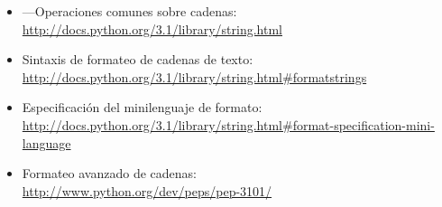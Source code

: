 \begin{itemize}

\item {}---Operaciones comunes sobre cadenas:\\
\href{http://docs.python.org/3.1/library/string.html}{http://docs.python.org/3.1/library/string.html}

\item Sintaxis de formateo de cadenas de texto:\\
\href{http://docs.python.org/3.1/library/string.html\#formatstrings}{http://docs.python.org/3.1/library/string.html\#formatstrings}

\item Especificación del minilenguaje de formato:\\
\href{http://docs.python.org/3.1/library/string.html\#format-specification-mini-language}{http://docs.python.org/3.1/library/string.html\#format-specification-mini-language}

\item {} Formateo avanzado de cadenas:\\
\href{http://www.python.org/dev/peps/pep-3101/}{http://www.python.org/dev/peps/pep-3101/}

\end{itemize}

